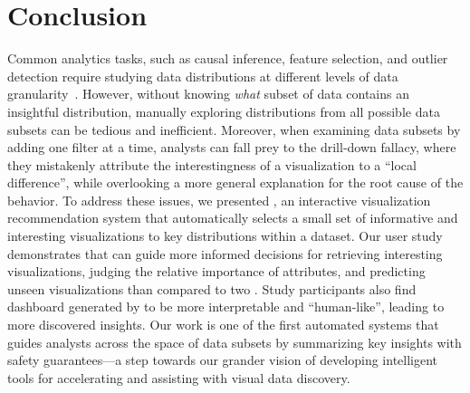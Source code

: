 \section{Conclusion}
\par Common analytics tasks, such as causal inference, feature selection, and outlier detection require studying data distributions at different levels of data granularity~\cite{Anand2015,Heer2012,Wu2013,Hullman2017}. However, without knowing \textit{what} subset of data contains an insightful distribution, manually exploring distributions from all possible data subsets can be tedious and inefficient. Moreover, when examining data subsets by adding one filter at a time, analysts can fall prey to the drill-down fallacy, where they mistakenly attribute the interestingness of a visualization to a ``local difference'', while overlooking a more general explanation for the root cause of the behavior. To address these issues, we presented \system, an interactive visualization recommendation system that automatically selects a small set of informative and interesting visualizations to  key distributions within a dataset. Our user study demonstrates that \system can guide  more informed decisions for retrieving interesting visualizations, judging the relative importance of attributes, and predicting unseen visualizations than compared to two . Study participants also find dashboard generated by \system to be more interpretable and ``human-like'', leading to more discovered insights. Our work is one of the first automated systems that guides analysts across the space of data subsets by summarizing key insights with safety guarantees---a step towards our grander vision of developing intelligent tools for accelerating and assisting with visual data discovery.
